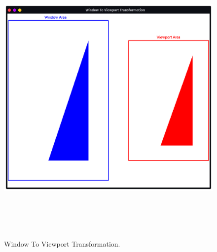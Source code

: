 \documentclass[12pt, a4]{article}
\begin{document}
\newpage
\subsection*{}
\begin{flushleft}

\end{flushleft}


\newpage
\subsection*{}
\begin{figure}[h]
\centering
\caption{Window To Viewport Transformation.}
\includegraphics[height=15cm, width=15cm]{Outputs/Output-6.png}
\end{figure}



\newpage
\end{document}
